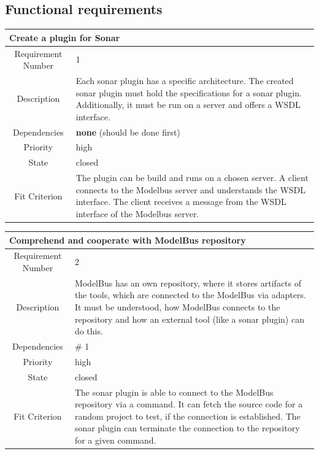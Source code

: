\subsection{Functional requirements}
\begin{longtable}{|c|p{10cm}|}
\hline 
\multicolumn{2}{|l|}{\textbf{Create a plugin for Sonar}} \\ 
\hline 
Requirement Number & 1 \\ \hline 
Description & Each sonar plugin has a specific architecture. The created sonar plugin must hold the specifications for a sonar plugin. Additionally, it must be run on a server and offers a WSDL interface. \\ \hline 
Dependencies & \textbf{none} (should be done first) \\ \hline 
Priority & high \\ \hline 
State & closed \\ \hline 
Fit Criterion & The plugin can be build and runs on a chosen server. A client connects to the Modelbus server and understands the WSDL interface. The client receives a message from the WSDL interface of the Modelbus server. \\ \hline 
\end{longtable}

\begin{longtable}{|c|p{10cm}|}
\hline 
\multicolumn{2}{|l|}{\textbf{Comprehend and cooperate with ModelBus repository}} \\ 
\hline 
Requirement Number & 2 \\ \hline 
Description & ModelBus has an own repository, where it stores artifacts of the tools, which are connected to the ModelBus via adapters. It must be understood, how ModelBus connects to the repository and how an external tool (like a sonar plugin) can do this. \\ \hline 
Dependencies & \# 1 \\ \hline 
Priority & high \\ \hline 
State & closed \\ \hline 
Fit Criterion & The sonar plugin is able to connect to the ModelBus repository via a command. It can fetch the source code for a random project to test, if the connection is established. The sonar plugin can terminate the connection to the repository for a given command. \\ \hline 
\end{longtable}

